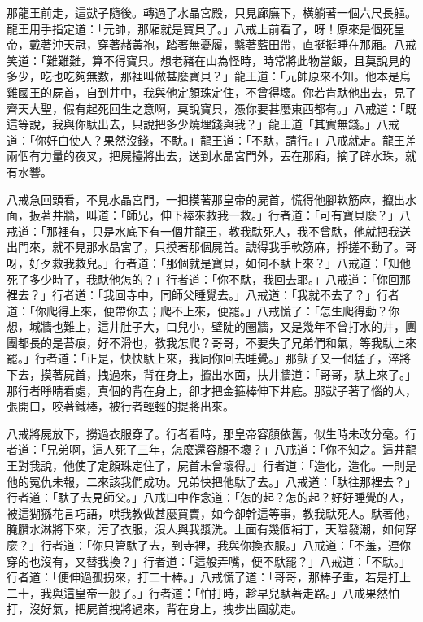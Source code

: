 那龍王前走，這獃子隨後。轉過了水晶宮殿，只見廊廡下，橫躺著一個六尺長軀。龍王用手指定道：「元帥，那廂就是寶貝了。」八戒上前看了，呀！原來是個死皇帝，戴著沖天冠，穿著赭黃袍，踏著無憂履，繫著藍田帶，直挺挺睡在那廂。八戒笑道：「難難難，算不得寶貝。想老豬在山為怪時，時常將此物當飯，且莫說見的多少，吃也吃夠無數，那裡叫做甚麼寶貝？」龍王道：「元帥原來不知。他本是烏雞國王的屍首，自到井中，我與他定顏珠定住，不曾得壞。你若肯馱他出去，見了齊天大聖，假有起死回生之意啊，莫說寶貝，憑你要甚麼東西都有。」八戒道：「既這等說，我與你馱出去，只說把多少燒埋錢與我？」龍王道「其實無錢。」八戒道：「你好白使人？果然沒錢，不馱。」龍王道：「不馱，請行。」八戒就走。龍王差兩個有力量的夜叉，把屍擡將出去，送到水晶宮門外，丟在那廂，摘了辟水珠，就有水響。

八戒急回頭看，不見水晶宮門，一把摸著那皇帝的屍首，慌得他腳軟筋麻，攛出水面，扳著井牆，叫道：「師兄，伸下棒來救我一救。」行者道：「可有寶貝麼？」八戒道：「那裡有，只是水底下有一個井龍王，教我馱死人，我不曾馱，他就把我送出門來，就不見那水晶宮了，只摸著那個屍首。諕得我手軟筋麻，掙搓不動了。哥呀，好歹救我救兒。」行者道：「那個就是寶貝，如何不馱上來？」八戒道：「知他死了多少時了，我馱他怎的？」行者道：「你不馱，我回去耶。」八戒道：「你回那裡去？」行者道：「我回寺中，同師父睡覺去。」八戒道：「我就不去了？」行者道：「你爬得上來，便帶你去；爬不上來，便罷。」八戒慌了：「怎生爬得動？你想，城牆也難上，這井肚子大，口兒小，壁陡的圈牆，又是幾年不曾打水的井，團團都長的是苔痕，好不滑也，教我怎爬？哥哥，不要失了兄弟們和氣，等我馱上來罷。」行者道：「正是，快快馱上來，我同你回去睡覺。」那獃子又一個猛子，淬將下去，摸著屍首，拽過來，背在身上，攛出水面，扶井牆道：「哥哥，馱上來了。」那行者睜睛看處，真個的背在身上，卻才把金箍棒伸下井底。那獃子著了惱的人，張開口，咬著鐵棒，被行者輕輕的提將出來。

八戒將屍放下，撈過衣服穿了。行者看時，那皇帝容顏依舊，似生時未改分毫。行者道：「兄弟啊，這人死了三年，怎麼還容顏不壞？」八戒道：「你不知之。這井龍王對我說，他使了定顏珠定住了，屍首未曾壞得。」行者道：「造化，造化。一則是他的冤仇未報，二來該我們成功。兄弟快把他馱了去。」八戒道：「馱往那裡去？」行者道：「馱了去見師父。」八戒口中作念道：「怎的起？怎的起？好好睡覺的人，被這猢猻花言巧語，哄我教做甚麼買賣，如今卻幹這等事，教我馱死人。馱著他，腌臢水淋將下來，污了衣服，沒人與我漿洗。上面有幾個補丁，天陰發潮，如何穿麼？」行者道：「你只管馱了去，到寺裡，我與你換衣服。」八戒道：「不羞，連你穿的也沒有，又替我換？」行者道：「這般弄嘴，便不馱罷？」八戒道：「不馱。」行者道：「便伸過孤拐來，打二十棒。」八戒慌了道：「哥哥，那棒子重，若是打上二十，我與這皇帝一般了。」行者道：「怕打時，趁早兒馱著走路。」八戒果然怕打，沒好氣，把屍首拽將過來，背在身上，拽步出園就走。

